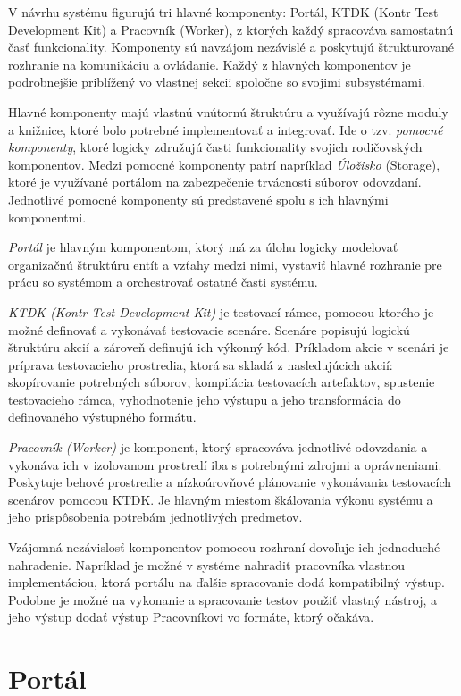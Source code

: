 \documentclass[
  digital, %
  twoside, %
  table,   %
  lof,     %
  lot,     %
]{fithesis3}
\begin{document}
V návrhu systému figurujú tri hlavné komponenty: Portál, KTDK (Kontr Test Development Kit) a Pracovník (Worker), z ktorých každý spracováva samostatnú časť funkcionality. Komponenty sú navzájom nezávislé a poskytujú štrukturované rozhranie na komunikáciu a ovládanie. Každý z hlavných komponentov je podrobnejšie priblížený vo vlastnej sekcii spoločne so svojimi subsystémami.

Hlavné komponenty majú vlastnú vnútornú štruktúru a využívajú rôzne moduly a knižnice, ktoré bolo potrebné implementovať a integrovať. Ide o tzv. \emph{pomocné komponenty}, ktoré logicky združujú časti funkcionality svojich rodičovských komponentov. Medzi pomocné komponenty patrí napríklad \textit{Úložisko} (Storage), ktoré je využívané portálom na zabezpečenie trvácnosti súborov odovzdaní. Jednotlivé pomocné komponenty sú predstavené spolu s ich hlavnými komponentmi.

\textit{Portál} je hlavným komponentom, ktorý má za úlohu logicky modelovať organizačnú štruktúru entít a vzťahy medzi nimi, vystaviť hlavné rozhranie pre prácu so systémom a orchestrovať ostatné časti systému. 

\textit{KTDK (Kontr Test Development Kit)} je testovací rámec, pomocou ktorého je možné definovať a vykonávať testovacie scenáre. Scenáre popisujú logickú štruktúru akcií a zároveň definujú ich výkonný kód. Príkladom akcie v scenári je príprava testovacieho prostredia, ktorá sa skladá z nasledujúcich akcií: skopírovanie potrebných súborov, kompilácia testovacích artefaktov, spustenie testovacieho rámca, vyhodnotenie jeho výstupu a jeho transformácia do definovaného výstupného formátu. 

\textit{Pracovník (Worker)} je komponent, ktorý spracováva jednotlivé odovzdania a vykonáva ich v izolovanom prostredí iba s potrebnými zdrojmi a oprávneniami. Poskytuje behové prostredie a nízkoúrovňové plánovanie vykonávania testovacích scenárov pomocou KTDK. Je hlavným miestom škálovania výkonu systému a jeho prispôsobenia potrebám jednotlivých predmetov.

Vzájomná nezávislosť komponentov pomocou rozhraní dovoľuje ich jednoduché nahradenie. Napríklad je možné v systéme nahradiť pracovníka vlastnou implementáciou, ktorá portálu na ďalšie spracovanie dodá kompatibilný výstup. Podobne je možné na vykonanie a spracovanie testov použiť vlastný nástroj, a jeho výstup dodať výstup Pracovníkovi vo formáte, ktorý očakáva.

\section{Portál}
\end{document}
